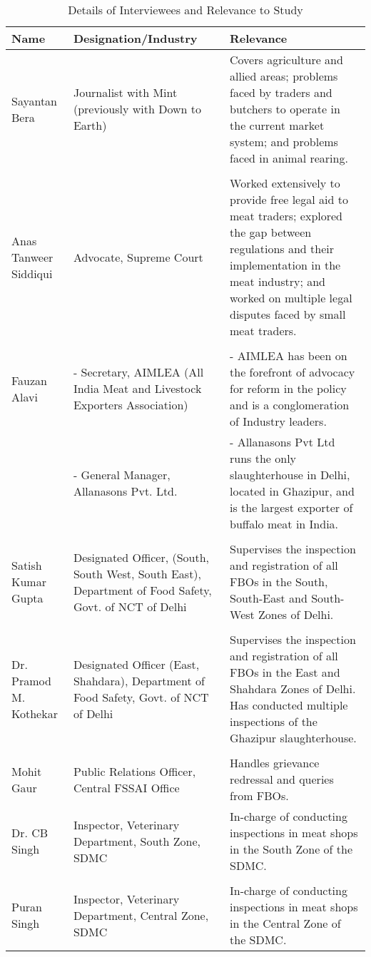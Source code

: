 \documentclass[a4paper, 12pt]{article}
\begin{document}
 \begin{longtable}{>{\raggedright}p{3cm}>{\raggedright}p{5cm}>{\raggedright\arraybackslash}p{7.5cm}}
\caption{Details of Interviewees and Relevance to Study} \\
Name & Designation/Industry & Relevance \\
\midrule
\endfirsthead
\endhead
\midrule
\endlastfoot
   
    Sayantan Bera & Journalist with Mint (previously with Down to Earth) & Covers agriculture and allied areas; problems faced by traders and butchers to operate in the current market system; and problems faced in animal rearing. \\
& & \\
    Anas Tanweer Siddiqui & Advocate, Supreme Court  & Worked extensively to provide free legal aid to meat traders; explored the gap between regulations and their implementation in the meat industry; and worked on multiple legal disputes faced by small meat traders. \\
& & \\
    Fauzan Alavi & - Secretary, AIMLEA (All India Meat and Livestock Exporters Association) & - AIMLEA has been on the forefront of advocacy for reform in the policy and is a conglomeration of Industry leaders. \\
    \multicolumn{1}{r}{} & - General Manager, Allanasons Pvt. Ltd. & - Allanasons Pvt Ltd runs the only slaughterhouse in Delhi, located in Ghazipur, and is the largest exporter of buffalo meat in India. \\
& & \\
    Satish Kumar Gupta & Designated Officer, (South, South West, South East), Department of Food Safety, Govt. of NCT of Delhi & Supervises the inspection and registration of all FBOs in the South, South-East and South-West Zones of Delhi. \\
& & \\
    Dr. Pramod M. Kothekar & Designated Officer (East, Shahdara), Department of Food Safety, Govt. of NCT of Delhi & Supervises the inspection and registration of all FBOs in the East and Shahdara Zones of Delhi. Has conducted multiple inspections of the Ghazipur slaughterhouse. \\
& & \\
    Mohit Gaur & Public Relations Officer, Central FSSAI Office & Handles grievance redressal and queries from FBOs.  \\
    Dr. CB Singh & Inspector, Veterinary Department, South Zone, SDMC & In-charge of conducting inspections in meat shops in the South Zone of the SDMC. \\
& & \\
    Puran Singh & Inspector, Veterinary Department, Central Zone, SDMC & In-charge of conducting inspections in meat shops in the Central Zone of the SDMC. \\
    \end{longtable}%
  \label{tab:addlabel}%
\end{document}
